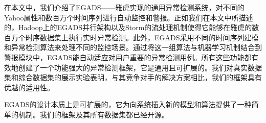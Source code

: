\documentclass[a4paper,AutoFakeBold,oneside,12pt]{book}
\begin{document}
在本文中，我们介绍了EGADS——雅虎实现的通用异常检测系统，对不同的Yahoo属性和数百万个时间序列进行自动监控和警报。正如我们在本文中所描述的，Hadoop上的EGADS并行架构以及Storm的流处理机制使得它能够在雅虎的数百万个时序数据集上执行实时异常检测。此外，EGADS采用不同的时间序列建模和异常检测算法来处理不同的监控场景。通过将这一组算法与机器学习机制结合到警报模块中，EGADS能自动适应对用户重要的异常检测用例。所有这些功能都有效地创建了一个功能强大的异常检测框架，它是通用且可扩展的。我们对真实数据集和综合数据集的展示实验表明，与其竞争对手的解决方案相比，我们的框架具有优越的适用性。

EGADS的设计本质上是可扩展的，它为向系统插入新的模型和算法提供了一种简单的机制。我们的框架及其所有数据集都已经开源。
\thispagestyle{empty}
\begin{center}


\end{center}

 


 
\end{document}
